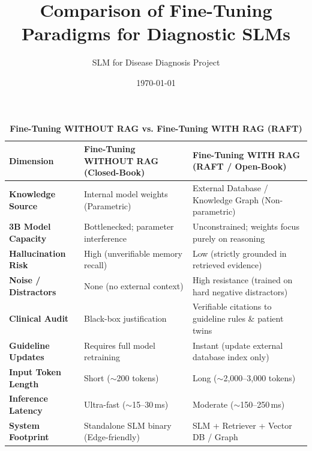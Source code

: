 \documentclass[11pt]{article}
\title{\textbf{Comparison of Fine-Tuning Paradigms for Diagnostic SLMs}}
\author{SLM for Disease Diagnosis Project}
\date{\today}
\begin{document}
\maketitle

\vspace{1em}

\begin{table}[h!]
\centering
\small
\renewcommand{\arraystretch}{1.3}
\caption{\textbf{Fine-Tuning WITHOUT RAG vs. Fine-Tuning WITH RAG (RAFT)}}
\label{tab:rag_vs_norag}
\begin{tabularx}{\textwidth}{@{}lXX@{}}
\toprule
\textbf{Dimension} & \textbf{Fine-Tuning WITHOUT RAG (Closed-Book)} & \textbf{Fine-Tuning WITH RAG (RAFT / Open-Book)} \\
\midrule
\textbf{Knowledge Source}    & Internal model weights (Parametric)  & External Database / Knowledge Graph (Non-parametric) \\
\textbf{3B Model Capacity}   & Bottlenecked; parameter interference & Unconstrained; weights focus purely on reasoning \\
\textbf{Hallucination Risk}  & High (unverifiable memory recall)    & Low (strictly grounded in retrieved evidence) \\
\textbf{Noise / Distractors} & None (no external context)           & High resistance (trained on hard negative distractors) \\
\textbf{Clinical Audit}      & Black-box justification              & Verifiable citations to guideline rules \& patient twins \\
\textbf{Guideline Updates}   & Requires full model retraining       & Instant (update external database index only) \\
\textbf{Input Token Length}  & Short ($\sim$200 tokens)             & Long ($\sim$2,000--3,000 tokens) \\
\textbf{Inference Latency}   & Ultra-fast ($\sim$15--30\,ms)        & Moderate ($\sim$150--250\,ms) \\
\textbf{System Footprint}    & Standalone SLM binary (Edge-friendly)& SLM + Retriever + Vector DB / Graph \\
\bottomrule
\end{tabularx}
\end{table}
\end{document}
